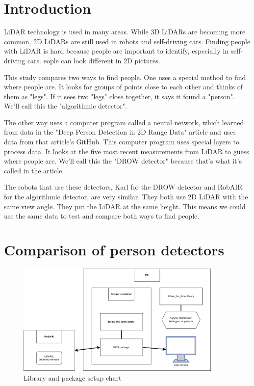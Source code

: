 \documentclass{article}
\begin{document}
\section{Introduction}

LiDAR technology is used in many areas\cite{lidar_market}.
While 3D LiDARs are becoming more common, 2D LiDARs are still used in robots\cite{lidar_popularity} and self-driving cars\cite{lidar_autonomous}.
Finding people with LiDAR is hard because people are important to identify, especially in self-driving cars. 
eople can look different in 2D pictures.

This study compares two ways to find people.
One uses a special method to find where people are.
It looks for groups of points close to each other and thinks of them as "legs".
If it sees two "legs" close together, it says it found a "person".
We'll call this the "algorithmic detector".

The other way uses a computer program called a neural network, which learned from data in the "Deep Person Detection in 2D Range Data" article\cite{DROW_2018} and uses data from that article's GitHub.
This computer program uses special layers to process data.
It looks at the five most recent measurements from LiDAR to guess where people are.
We'll call this the "DROW detector" because that's what it's called in the article.

The robots that use these detectors, Karl for the DROW detector and RobAIR for the algorithmic detector\cite{RobAIR_site}, are very similar.
They both use 2D LiDAR with the same view angle.
They put the LiDAR at the same height.
This means we could use the same data to test and compare both ways to find people.

\section{Comparison of person detectors}

\begin{figure}[t!]
	\centering
	\includegraphics[width=0.9\textwidth]{ftd_setup_chart}
	\caption{Library and package setup chart}
	\label{fig:ftd_setup_chart}
\end{figure}
\end{document}
